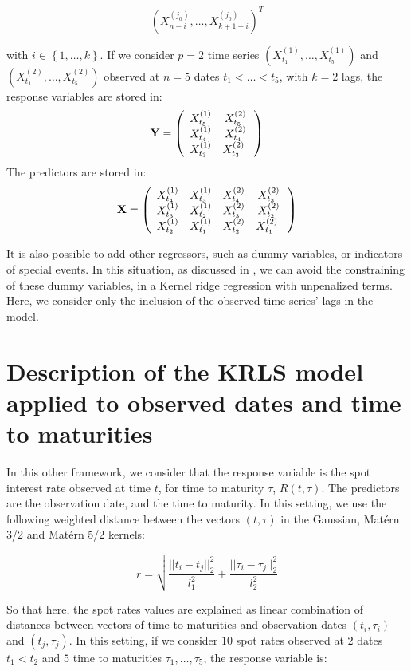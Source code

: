 \begin{equation}
\left( X^{(j_0)}_{n-i}, \ldots, X^{(j_0)}_{k+1-i} \right)^T
\end{equation}

with $i \in
\left\lbrace 1, \ldots, k \right\rbrace$. If we consider $p = 2$ time series $(X^{(1)}_{t_1}, \ldots,  X^{(1)}_{t_5})$ and $(X^{(2)}_{t_1}, \ldots,  X^{(2)}_{t_5})$ observed at $n = 5$ dates $t_1 < \ldots < t_5$, with $k = 2$ lags,  the response variables are stored in:
$$
{\bf Y} = \left( {\begin{array}{cc} X^{(1)}_{t_5} &  X^{(2)}_{t_5}\\ X^{(1)}_{t_4} & X^{(2)}_{t_4} \\ X^{(1)}_{t_3} & X^{(2)}_{t_3}\      \end{array} } \right)
$$
The predictors are stored in:
$$
{\bf X} = \left( {\begin{array}{cccc} X^{(1)}_{t_4} & X^{(1)}_{t_3} & X^{(2)}_{t_4} & X^{(2)}_{t_3} \\ X^{(1)}_{t_3} & X^{(1)}_{t_2} & X^{(2)}_{t_3} & X^{(2)}_{t_2} \\ X^{(1)}_{t_2} & X^{(1)}_{t_1} & X^{(2)}_{t_2} & X^{(2)}_{t_1} \      \end{array} }\right)
$$


It is also possible to add other regressors, such as dummy variables, or indicators of special events. In this situation, as discussed in \cite{exterkate2016nonlinear}, we can avoid the constraining of these dummy variables, in a Kernel ridge regression with unpenalized terms. Here, we consider only the inclusion of the observed time series' lags in the model.

\section{Description of the KRLS model applied to observed dates and time to maturities}
\label{sec:purekrls}

In this other framework, we consider that the response variable is the spot interest rate observed at time $t$, for time to maturity $\tau$, $R(t, \tau)$. The predictors are the observation date, and the time to maturity. In this setting, we use the following weighted distance between the vectors $(t, \tau)$ in the Gaussian, Mat\'ern 3/2 and Mat\'ern 5/2 kernels:

$$
r = \sqrt{\frac{||t_i - t_j||^2_2}{l_1^2} + \frac{||\tau_i - \tau_j||^2_2}{l_2^2}}
$$

So that here, the spot rates values are explained as linear combination of distances between vectors of  time to maturities and observation dates $(t_i, \tau_i)$ and $(t_j, \tau_j)$. In this setting, if we consider $10$ spot rates observed at $2$ dates $t_1 < t_2$ and $5$ time to maturities $\tau_1, \ldots, \tau_5$, the response variable is:

